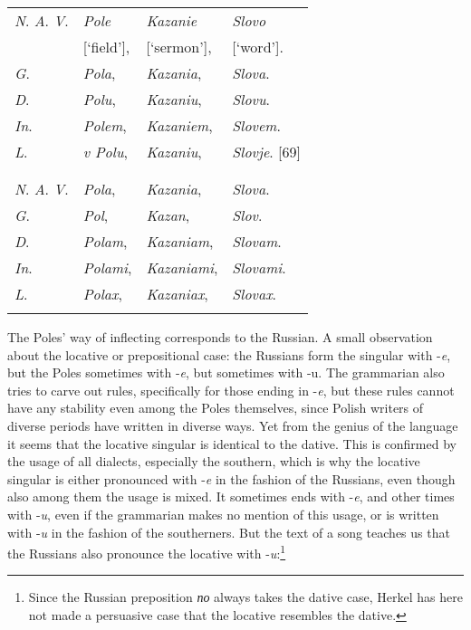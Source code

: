 \begin{longtable}{ l l l l }
    \lsptoprule
    \multicolumn{4}{ c }{Singular.} \\
    \midrule
    \textit{N}. \textit{A}. \textit{V}. & \textit{Pole} & \textit{Kazanie} & \textit{Slovo} \\
    & [‘field’], & [‘sermon’], & [‘word’]. \\
    \textit{G}. & \textit{Pola}, & \textit{Kazania}, & \textit{Slova}. \\
    \textit{D}. & \textit{Polu}, & \textit{Kazaniu}, & \textit{Slovu}. \\ 
    \textit{In}. & \textit{Polem}, & \textit{Kazaniem}, & \textit{Slovem}. \\
    \textit{L}. & \textit{v Polu}, & \textit{Kazaniu}, & \textit{Slovje}. [69] \\
    \lspbottomrule
    \\
    \lsptoprule
    \multicolumn{4}{ c }{Plural.} \\
    \midrule
    \textit{N}. \textit{A}. \textit{V}. & \textit{Pola}, & \textit{Kazania}, & \textit{Slova}. \\
    \textit{G}. & \textit{Pol}, & \textit{Kazan}, & \textit{Slov}. \\
    \textit{D}. & \textit{Polam}, & \textit{Kazaniam}, & \textit{Slovam}. \\
    \textit{In}. & \textit{Polami}, & \textit{Kazaniami}, & \textit{Slovami}. \\
    \textit{L}. & \textit{Polax}, & \textit{Kazaniax}, & \textit{Slovax}. \\
    \lspbottomrule
\end{longtable}

The Poles’ way of inflecting corresponds to the Russian. A small observation about the locative or prepositional case: the Russians form the singular with -\textit{e}, but the Poles sometimes with -\textit{e}, but sometimes with -u. The grammarian also tries to carve out rules, specifically for those ending in -\textit{e}, but these rules cannot have any stability even among the Poles themselves, since Polish writers of diverse periods have written in diverse ways. Yet from the genius of the language it seems that the locative singular is identical to the dative. This is confirmed by the usage of all dialects, especially the southern, which is why the locative singular is either pronounced with -\textit{e} in the fashion of the Russians, even though also among them the usage is mixed. It sometimes ends with -\textit{e}, and other times with -\textit{u}, even if the grammarian makes no mention of this usage, or is written with -\textit{u} in the fashion of the southerners. But the text of a song teaches us that the Russians also pronounce the locative with -\textit{u}:\footnote{Since the Russian preposition \textit{по} always takes the dative case, Herkel has here not made a persuasive case that the locative resembles the dative.} \\

